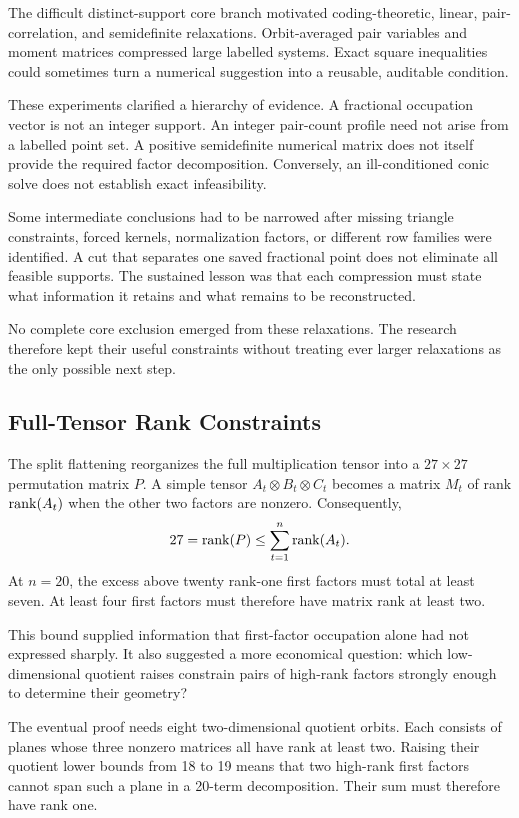 The difficult distinct-support core branch motivated coding-theoretic,
linear, pair-correlation, and semidefinite relaxations. Orbit-averaged
pair variables and moment matrices compressed large labelled systems.
Exact square inequalities could sometimes turn a numerical suggestion
into a reusable, auditable condition.

These experiments clarified a hierarchy of evidence. A fractional
occupation vector is not an integer support. An integer pair-count
profile need not arise from a labelled point set. A positive
semidefinite numerical matrix does not itself provide the required
factor decomposition. Conversely, an ill-conditioned conic solve
does not establish exact infeasibility.

Some intermediate conclusions had to be narrowed after missing
triangle constraints, forced kernels, normalization factors, or
different row families were identified. A cut that separates one
saved fractional point does not eliminate all feasible supports.
The sustained lesson was that each compression must state what
information it retains and what remains to be reconstructed.

No complete core exclusion emerged from these relaxations. The
research therefore kept their useful constraints without treating
ever larger relaxations as the only possible next step.

\subsection{Full-Tensor Rank Constraints}\label{route:full}

The split flattening reorganizes the full multiplication tensor into
a $27\times27$ permutation matrix $P$. A simple tensor
$A_t\otimes B_t\otimes C_t$ becomes a matrix $M_t$ of rank
$\operatorname{rank}(A_t)$ when the other two factors are nonzero. Consequently,
\[
 27=\operatorname{rank}(P)\le\sum_{t=1}^{n}\operatorname{rank}(A_t).
\]
At $n=20$, the excess above twenty rank-one first factors must total
at least seven. At least four first factors must therefore have
matrix rank at least two.

This bound supplied information that first-factor occupation alone
had not expressed sharply. It also suggested a more economical
question: which low-dimensional quotient raises constrain pairs
of high-rank factors strongly enough to determine their geometry?

The eventual proof needs eight two-dimensional quotient orbits.
Each consists of planes whose three nonzero matrices all have rank
at least two. Raising their quotient lower bounds from 18 to 19
means that two high-rank first factors cannot span such a plane
in a 20-term decomposition. Their sum must therefore have rank one.

